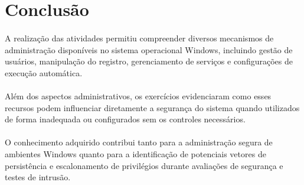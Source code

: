\section{Conclusão}

\paragraph{}
A realização das atividades permitiu compreender diversos mecanismos de
administração disponíveis no sistema operacional Windows, incluindo gestão de
usuários, manipulação do registro, gerenciamento de serviços e configurações de
execução automática.

\paragraph{}
Além dos aspectos administrativos, os exercícios evidenciaram como esses
recursos podem influenciar diretamente a segurança do sistema quando utilizados
de forma inadequada ou configurados sem os controles necessários.

\paragraph{}
O conhecimento adquirido contribui tanto para a administração segura de
ambientes Windows quanto para a identificação de potenciais vetores de
persistência e escalonamento de privilégios durante avaliações de segurança e
testes de intrusão.
